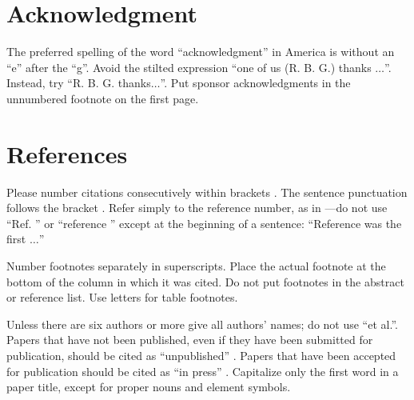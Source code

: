 \documentclass[conference]{IEEEtran}
\begin{document}
\begin{comment}
\begin{figure}[htbp]
\centerline{\texttt{[image: fig1.png]}}
\caption{Example of a figure caption.}
\label{fig}
\end{figure}

Figure Labels: Use 8 point Times New Roman for Figure labels. Use words 
rather than symbols or abbreviations when writing Figure axis labels to 
avoid confusing the reader. As an example, write the quantity 
``Magnetization'', or ``Magnetization, M'', not just ``M''. If including 
units in the label, present them within parentheses. Do not label axes only 
with units. In the example, write ``Magnetization (A/m)'' or ``Magnetization 
\{A[m(1)]\}'', not just ``A/m''. Do not label axes with a ratio of 
quantities and units. For example, write ``Temperature (K)'', not 
``Temperature
#$$$$$$$$$$$$$$$$$$$$$$$$$$$$$$$$$$ comment END #####################################/K''.
\end{comment}
\section*{Acknowledgment}

The preferred spelling of the word ``acknowledgment'' in America is without 
an ``e'' after the ``g''. Avoid the stilted expression ``one of us (R. B. 
G.) thanks $\ldots$''. Instead, try ``R. B. G. thanks$\ldots$''. Put sponsor 
acknowledgments in the unnumbered footnote on the first page.

\section*{References}

Please number citations consecutively within brackets \cite{b1}. The 
sentence punctuation follows the bracket \cite{b2}. Refer simply to the reference 
number, as in \cite{b3}---do not use ``Ref. \cite{b3}'' or ``reference \cite{b3}'' except at 
the beginning of a sentence: ``Reference \cite{b3} was the first $\ldots$''

Number footnotes separately in superscripts. Place the actual footnote at 
the bottom of the column in which it was cited. Do not put footnotes in the 
abstract or reference list. Use letters for table footnotes.

Unless there are six authors or more give all authors' names; do not use 
``et al.''. Papers that have not been published, even if they have been 
submitted for publication, should be cited as ``unpublished'' \cite{b4}. Papers 
that have been accepted for publication should be cited as ``in press'' \cite{b5}. 
Capitalize only the first word in a paper title, except for proper nouns and 
element symbols.
\end{document}

